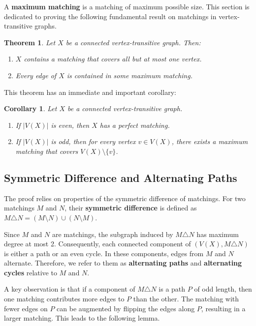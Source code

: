 \documentclass[12pt,a4paper,openany]{book}
\newtheorem{theorem}{Theorem}[section]
\newtheorem{corollary}{Corollary}[section]
\begin{document}
A \textbf{maximum matching} is a matching of maximum possible size. This section is dedicated to proving the following fundamental result on matchings in vertex-transitive graphs.

\begin{theorem}\label{thm:main-matching}
Let $X$ be a connected vertex-transitive graph. Then:
\begin{enumerate}[label=(\roman*)]
    \item $X$ contains a matching that covers all but at most one vertex.
    \item Every edge of $X$ is contained in some maximum matching.
\end{enumerate}
\end{theorem}

This theorem has an immediate and important corollary:
\begin{corollary}
Let $X$ be a connected vertex-transitive graph.
\begin{enumerate}[label=(\roman*)]
    \item If $|V(X)|$ is even, then $X$ has a perfect matching.
    \item If $|V(X)|$ is odd, then for every vertex $v \in V(X)$, there exists a maximum matching that covers $V(X) \setminus \{v\}$.
\end{enumerate}
\end{corollary}

\subsection*{Symmetric Difference and Alternating Paths}

The proof relies on properties of the symmetric difference of matchings. For two matchings $M$ and $N$, their \textbf{symmetric difference} is defined as $M \triangle N = (M \setminus N) \cup (N \setminus M)$.

Since $M$ and $N$ are matchings, the subgraph induced by $M \triangle N$ has maximum degree at most 2. Consequently, each connected component of $(V(X), M \triangle N)$ is either a path or an even cycle. In these components, edges from $M$ and $N$ alternate. Therefore, we refer to them as \textbf{alternating paths} and \textbf{alternating cycles} relative to $M$ and $N$.

A key observation is that if a component of $M \triangle N$ is a path $P$ of odd length, then one matching contributes more edges to $P$ than the other. The matching with fewer edges on $P$ can be augmented by flipping the edges along $P$, resulting in a larger matching. This leads to the following lemma.
\end{document}
